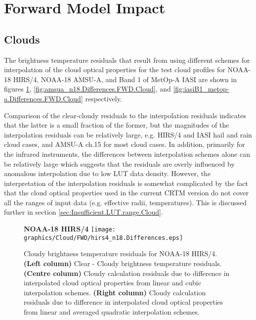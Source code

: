 \section{Forward Model Impact}

\subsection{Clouds}
The brightness temperature residuals that result from using different schemes for interpolation of the cloud optical properties for the test cloud profiles for NOAA-18 HIRS/4, NOAA-18 AMSU-A, and Band 1 of MetOp-A IASI are shown in figures \ref{fig:hirs4_n18.Differences.FWD.Cloud}, \ref{fig:amsua_n18.Differences.FWD.Cloud}, and \ref{fig:iasiB1_metop-a.Differences.FWD.Cloud} respectively.

Comparison of the clear-cloudy residuals to the interpolation residuals indicates that the latter is a small fraction of the former, but the magnitudes of the interpolation residuals can be relatively large, e.g. HIRS/4 and IASI hail and rain cloud cases, and AMSU-A ch.15 for most cloud cases. In addition, primarily for the infrared instruments, the differences between interpolation schemes alone can be relatively large which suggests that the residuals are overly influenced by anomalous interpolation due to low LUT data density. However, the interpretation of the interpolation residuals is somewhat complicated by the fact that the cloud optical properties used in the current CRTM version do not cover all the ranges of input data (e.g. effective radii, temperatures). This is discussed further in section  \ref{sec:Insufficient.LUT.range.Cloud}.
 
\begin{figure}[htp]
  \centering
  \textsf{\textbf{NOAA-18 HIRS/4}}\vspace{1.5ex}
  \texttt{[image: graphics/Cloud/FWD/hirs4\_n18.Differences.eps]}
  \caption{Cloudy brightness temperature residuals for NOAA-18 HIRS/4. \textbf{(Left column)} Clear - Cloudy brightness temperature residuals. \textbf{(Centre column)} Cloudy calculation residuals due to difference in interpolated cloud optical properties from linear and cubic interpolation schemes. \textbf{(Right column)} Cloudy calculation residuals due to difference in interpolated cloud optical properties from linear and averaged quadratic interpolation schemes.}
  \label{fig:hirs4_n18.Differences.FWD.Cloud}
\end{figure}

